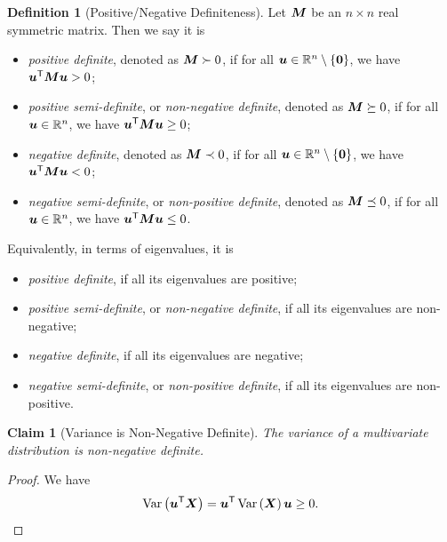 \documentclass[11pt]{article}
\numberwithin{equation}{section}
\newtheorem{claim}[theorem]{Claim}
\theoremstyle{definition}
\newtheorem{definition}[theorem]{Definition}
\theoremstyle{remark}
\newcommand{\pqty}[1]{\left(#1\right)}
\newcommand{\Bqty}[1]{\left\{#1\right\}}
\newcommand{\RR}{\mathbb R}
\newcommand{\transpose}{^{\mathsf T}}
\DeclareMathOperator{\Var}{Var}
\newcommand{\posDef}{\succ}
\newcommand{\posDefEq}{\succeq}
\newcommand{\negDef}{\prec}
\newcommand{\negDefEq}{\preceq}
\begin{document}
\begin{definition}[Positive/Negative Definiteness]\label{probability-definition-059}
    \label{probability-def:positive-negative-definiteness}%
    Let \(\vb{M}\) be an \(n \times n\) real symmetric matrix. Then we say it is
    \begin{itemize}
        \item \emph{positive definite}, denoted as \(\vb{M} \posDef 0\), if for all \(\vb{u} \in \RR^n \setminus \Bqty{\vb{0}}\), we have \(\vb{u}\transpose \vb{M} \vb{u} > 0\);
        \item \emph{positive semi-definite}, or \emph{non-negative definite}, denoted as \(\vb{M} \posDefEq 0\), if for all \(\vb{u} \in \RR^n\), we have \(\vb{u} \transpose \vb{M} \vb{u} \geq 0\);
        \item \emph{negative definite}, denoted as \(\vb{M} \negDef 0\), if for all \(\vb{u} \in \RR^n \setminus \Bqty{\vb{0}}\), we have \(\vb{u}\transpose \vb{M} \vb{u} < 0\);
        \item \emph{negative semi-definite}, or \emph{non-positive definite}, denoted as \(\vb{M} \negDefEq 0\), if for all \(\vb{u} \in \RR^n\), we have \(\vb{u} \transpose \vb{M} \vb{u} \leq 0\).
    \end{itemize}

    Equivalently, in terms of eigenvalues, it is
    \begin{itemize}
        \item \emph{positive definite}, if all its eigenvalues are positive;
        \item \emph{positive semi-definite}, or \emph{non-negative definite}, if all its eigenvalues are non-negative;
        \item \emph{negative definite}, if all its eigenvalues are negative;
        \item \emph{negative semi-definite}, or \emph{non-positive definite}, if all its eigenvalues are non-positive.
    \end{itemize}
\end{definition}

\begin{claim}[Variance is Non-Negative Definite]\label{probability-claim-001}
    \label{probability-claim:variance-non-negative-definite}%
    The variance of a multivariate distribution is non-negative definite.
\end{claim}

\begin{proof}\label{probability-proof-073}
    We have
    \[
        \Var\pqty{\vb{u}\transpose \vb{X}} = \vb{u}\transpose \Var\pqty{\vb{X}} \vb{u} \geq 0.
    \]
\end{proof}
\end{document}
